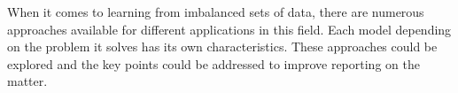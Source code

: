 When it comes to learning from imbalanced sets of data, there are numerous approaches 
available for different applications in this field. Each model depending on the problem 
it solves has its own characteristics. These approaches could be explored and the key points 
could be addressed to improve reporting on the matter.

